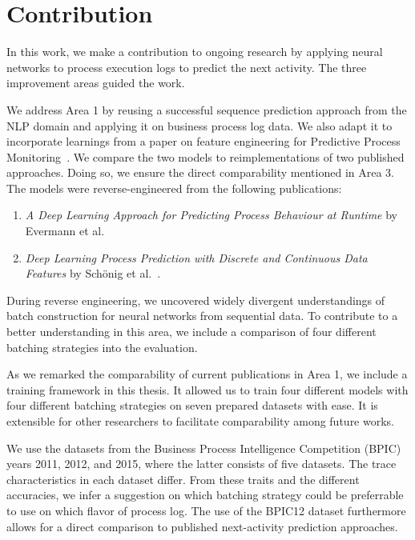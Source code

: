 \section{Contribution}\label{sec:intro:contribution}
In this work, we make a contribution to ongoing research by applying neural networks to process execution logs to predict the next activity. The three improvement areas guided the work.

We address Area 1 by reusing a successful sequence prediction approach from the NLP domain and applying it on business process log data. We also adapt it to incorporate learnings from a paper on feature engineering for Predictive Process Monitoring~\cite{klinkmuller2018reliablemonitoring}. We compare the two models to reimplementations of two published approaches. Doing so, we ensure the direct comparability mentioned in Area 3. The models were reverse-engineered from the following publications:

\begin{enumerate}
    \item\textit{A Deep Learning Approach for Predicting Process Behaviour at Runtime} by Evermann et al.~\cite{evermann2016}
    \item\textit{Deep Learning Process Prediction with Discrete and Continuous Data Features} by Schönig et al.~\cite{schoenig2018}.
\end{enumerate}

During reverse engineering, we uncovered widely divergent understandings of batch construction for neural networks from sequential data. To contribute to a better understanding in this area, we include a comparison of four different batching strategies into the evaluation.

As we remarked the comparability of current publications in Area 1, we include a training framework in this thesis. It allowed us to train four different models with four different batching strategies on seven prepared datasets with ease. It is extensible for other researchers to facilitate comparability among future works.

We use the datasets from the Business Process Intelligence Competition (BPIC) years 2011, 2012, and 2015, where the latter consists of five datasets. The trace characteristics in each dataset differ. From these traits and the different accuracies, we infer a suggestion on which batching strategy could be preferrable to use on which flavor of process log. The use of the BPIC12 dataset furthermore allows for a direct comparison to published next-activity prediction approaches.

